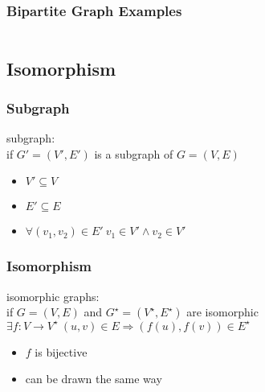 \documentclass[dvipsnames]{beamer}
\begin{document}
\begin{frame}
  \frametitle{Bipartite Graph Examples}

  \begin{columns}[t]
    \begin{example}[$K_{2,3}$]
      \begin{center}
      \end{center}
    \end{example}

    \begin{example}[$K_{3,3}$]
      \begin{center}
      \end{center}
    \end{example}
  \end{columns}
\end{frame}

\subsection{Isomorphism}

\begin{frame}
  \frametitle{Subgraph}

  \begin{definition}
    \alert{subgraph}:\\
      if $G'=(V',E')$ is a subgraph of $G=(V,E)$

    \begin{itemize}
      \item $V' \subseteq V$
      \item $E' \subseteq E$
      \item $\forall (v_1,v_2) \in E'~v_1 \in V' \wedge v_2 \in V'$
    \end{itemize}
  \end{definition}
\end{frame}

\begin{frame}
  \frametitle{Isomorphism}

  \begin{definition}
    \alert{isomorphic graphs}:\\
    if $G=(V,E)$ and $G^\star=(V^\star,E^\star)$ are isomorphic\\
    $\exists f: V \rightarrow V^\star~(u,v) \in E \Rightarrow (f(u),f(v)) \in E^\star$

    \begin{itemize}
      \item $f$ is bijective
    \end{itemize}
  \end{definition}

  \pause
  \begin{itemize}
    \item can be drawn the same way
  \end{itemize}
\end{frame}
\end{document}
